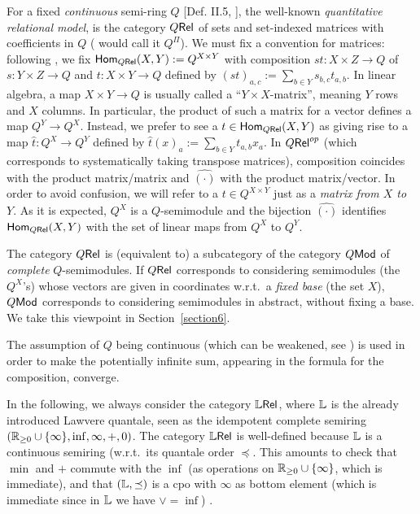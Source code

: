 For a fixed \emph{continuous} semi-ring $Q$ [Def. II.5, \cite{Manzo2013}], the well-known \emph{quantitative relational model}, is the category $Q \mathsf{Rel}$ of sets and set-indexed matrices with coefficients in $Q$ (\cite{Manzo2013} would call it $Q^\Pi$).
We must fix a convention for matrices: following \cite{Manzo2013, Hofmann2014, Ehrhard2005}, we fix $\mathsf{Hom}_{Q \mathsf{Rel}}(X,Y):=Q^{X\times Y}$ with composition $st:X\times Z\to Q$ of $s:Y\times Z\to Q$ and $t:X\times Y\to Q$ defined by $(st)_{a,c}:=\sum\limits_{b\in Y} s_{b,c}t_{a,b}$.
In linear algebra, a map $X\times Y\to Q$ is usually called a ``$Y\times X$-matrix'', meaning $Y$ rows and $X$ columns.
In particular, the product of such a matrix for a vector defines a map $Q^Y\to Q^X$.
Instead, we prefer to see a $t\in\mathsf{Hom}_{Q \mathsf{Rel}}(X,Y)$ as giving rise to a map $\hat t:Q^X\to Q^Y$ defined by $\hat t(x)_a:=\sum\limits_{b\in Y} t_{a,b}x_a$.
In $Q \mathsf{Rel}^{op}$ (which corresponds to systematically taking transpose matrices), composition coincides with the product matrix/matrix and $\hat{(\cdot)}$ with the product matrix/vector.
In order to avoid confusion, we will refer to a $t\in Q^{X\times Y}$ just as a \emph{matrix from $X$ to $Y$}.
As it is expected, $Q^X$ is a $Q$-semimodule and the bijection $\hat{(\cdot)}$ identifies $\mathsf{Hom}_{Q \mathsf{Rel}}(X,Y)$ with the set of linear maps from $Q^X$ to $Q^Y$.

\begin{remark}
 The category $Q \mathsf{Rel}$ is (equivalent to) a subcategory of the category $Q\mathsf{Mod}$ of \emph{complete} $Q$-semimodules.
 If $Q \mathsf{Rel}$ corresponds to considering semimodules (the $Q^X$'s) whose vectors are given in coordinates w.r.t.\ a \emph{fixed base} (the set $X$), $Q\mathsf{Mod}$ corresponds to considering semimodules in abstract, without fixing a base.
 We take this viewpoint in Section~\ref{section6}.
\end{remark}

The assumption of $Q$ being continuous (which can be weakened, see \cite{???}) is used in order to make the potentially infinite sum, appearing in the formula for the composition, converge.

In the following, we always consider the category $\mathbb{L} \mathsf{Rel}$, where $\mathbb{L}$ is the already introduced Lawvere quantale, seen as the idempotent complete semiring $(\mathbb{R}_{\geq0}\cup\{\infty\},\inf,\infty,+,0)$.
The category $\mathbb{L} \mathsf{Rel}$ is well-defined because $\mathbb{L}$ is a continuous semiring (w.r.t.\ its quantale order $\preceq$.
This amounts to check that $\min$ and $+$ commute with the $\inf$ (as operations on $\mathbb{R}_{\geq0}\cup\{\infty\}$, which is immediate), and that $(\mathbb{L},\preceq)$ is a cpo with $\infty$ as bottom element (which is immediate since in $\mathbb{L}$ we have $\vee = \inf$) .

